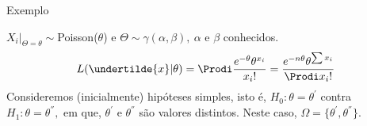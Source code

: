 \begin{frame}{Exemplo}
\begin{block}{}
\justifying
$X_{i}|_{\Theta=\theta}\sim$Poisson($\theta$) e $\Theta\sim \gamma(\alpha,\beta),~\alpha$ e $\beta$ conhecidos.
\begin{align*}
    L(\undertilde{x}|\theta)=\Prodi \dfrac{e^{-\theta}\theta^{x_{i}}}{x_{i}!}=\dfrac{e^{-n\theta}\theta^{\sum x_{i}}}{\Prodi x_{i}!}
\end{align*}
Consideremos (inicialmente) hipóteses simples, isto é, $H_{0}:\theta=\theta^{'}$ contra $H_{1}:\theta=\theta^{''},$ em que, $\theta^{'}$ e $\theta^{''}$ são valores distintos. Neste caso, $\Omega=\{\theta^{'},\theta^{''}\}.$
\end{block}
\end{frame}